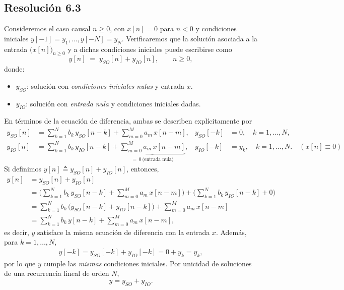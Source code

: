 \documentclass[
  11pt,
  letterpaper,
   addpoints,
  ]{exam}
\begin{document}
\begin{questions}
\begin{solution}
\subsection*{Resolución 6.3}
Consideremos el caso causal $n\ge 0$, con $x[n]=0$ para $n<0$ y condiciones iniciales
$y[-1]=y_1,\dots,y[-N]=y_N$. Verificaremos que la solución asociada a la entrada $\big(x[n]\big)_{n\ge 0}$ y a dichas condiciones iniciales puede escribirse como
\begin{equation*}
  y[n] \;=\; y_{SO}[n]+y_{IO}[n], \qquad n\ge 0,
\end{equation*}
donde:
\begin{itemize}
  \item $y_{SO}$: solución con \emph{condiciones iniciales nulas} y entrada $x$.
  \item $y_{IO}$: solución con \emph{entrada nula} y condiciones iniciales dadas.
\end{itemize}
En términos de la ecuación de diferencia, ambas se describen explícitamente por
\begin{align}
  y_{SO}[n] &= \sum_{k=1}^{N} b_k\,y_{SO}[n-k] + \sum_{m=0}^{M} a_m\,x[n-m],
  & y_{SO}[-k]&=0,\quad k=1,\dots,N, \\
  y_{IO}[n] &= \sum_{k=1}^{N} b_k\,y_{IO}[n-k]
  + \underbrace{\sum_{m=0}^{M} a_m\,x[n-m]}_{=\,0\ \text{(entrada nula)}},
  & y_{IO}[-k]&=y_k,\quad k=1,\dots,N.\quad (x[n]\equiv 0)
\end{align}
Si definimos $y[n]\triangleq y_{SO}[n]+y_{IO}[n]$, entonces,
\begin{align}
  y[n]
  &= y_{SO}[n]+y_{IO}[n] \\
  &= \Big(\sum_{k=1}^{N} b_k\,y_{SO}[n-k] + \sum_{m=0}^{M} a_m\,x[n-m]\Big)
   + \Big(\sum_{k=1}^{N} b_k\,y_{IO}[n-k] + 0\Big) \\
  &= \sum_{k=1}^{N} b_k\,\big(y_{SO}[n-k]+y_{IO}[n-k]\big)
     + \sum_{m=0}^{M} a_m\,x[n-m] \\
  &= \sum_{k=1}^{N} b_k\,y[n-k] + \sum_{m=0}^{M} a_m\,x[n-m],
\end{align}
es decir, $y$ satisface la misma ecuación de diferencia con la entrada $x$. Además, para $k=1,\dots,N$,
\begin{align}
  y[-k] = y_{SO}[-k]+y_{IO}[-k] = 0 + y_k = y_k,
\end{align}
por lo que $y$ cumple las \emph{mismas} condiciones iniciales. Por unicidad de soluciones de una recurrencia lineal de orden $N$,
\[
  \boxed{\,y = y_{SO}+y_{IO}.\,}
\]


\end{solution}
\end{questions}
\end{document}
